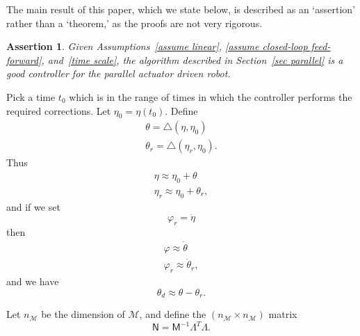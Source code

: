 \documentclass[oneside,twocolumn,reqno]{amsart}
\newcommand{\liediff}{\mathbin{\triangle}}
\newtheorem{assertion}{Assertion}
\begin{document}
The main result of this paper, which we state below, is described as an `assertion' rather than a `theorem,' as the proofs are not very rigorous.

\begin{assertion}
\label{main}
Given Assumptions~\ref{assume linear}, \ref{assume closed-loop feed-forward}, and~\ref{time scale}, the algorithm described in Section~\ref{sec parallel} is a good controller for the parallel actuator driven robot.
\end{assertion}

Pick a time $t_0$ which is in the range of times in which the controller performs the required corrections.  Let $\eta_0 = \eta(t_0)$.  Define
\begin{gather}
\theta = \liediff(\eta, \eta_0) \\
\theta_r = \liediff(\eta_r, \eta_0) .
\end{gather}
Thus
\begin{gather}
\label{approx eta}
\eta \approx \eta_0 + \theta \\
\label{approx eta r}
\eta_r \approx \eta_0 + \theta_r ,
\end{gather}
and if we set
\begin{equation}
\varphi_r = \dot \eta
\end{equation}
then
\begin{gather}
\label{varphi}
\varphi \approx \dot \theta \\
\label{varphi_r}
\varphi_r \approx \dot \theta_r ,
\end{gather}
and we have
\begin{equation}
\label{theta d theta theta r}
\theta_d \approx \theta - \theta_r.
\end{equation}

Let $n_{\mathcal M}$ be the dimension of $\mathcal M$, and define the $(n_{\mathcal M} \times n_{\mathcal M})$ matrix
\begin{equation}
\mathsf N = \mathsf M^{-1} \mathsf\Lambda^T \mathsf\Lambda.
\end{equation}
\end{document}
